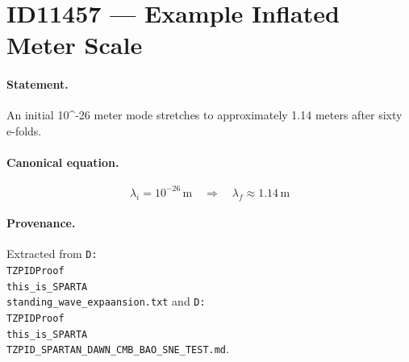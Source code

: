 \section*{ID11457 --- Example Inflated Meter Scale}

\paragraph{Statement.}
An initial 10^-26 meter mode stretches to approximately 1.14 meters after sixty e-folds.

\paragraph{Canonical equation.}
\[
\lambda_i=10^{-26}\,\mathrm{m}\quad\Longrightarrow\quad\lambda_f\approx1.14\,\mathrm{m}
\]

\paragraph{Provenance.}
Extracted from \texttt{D:\\TZPIDProof\\this\_is\_SPARTA\\standing\_wave\_expaansion.txt} and \texttt{D:\\TZPIDProof\\this\_is\_SPARTA\\TZPID\_SPARTAN\_DAWN\_CMB\_BAO\_SNE\_TEST.md}.
